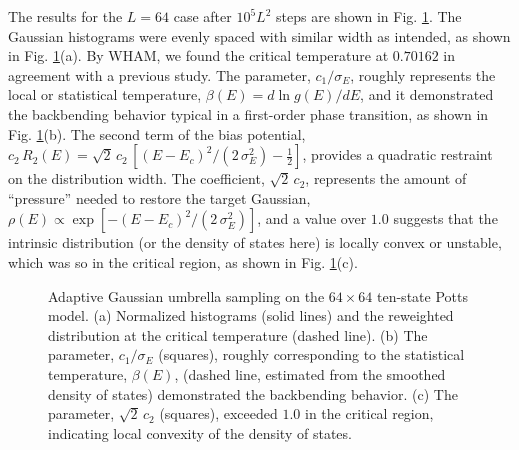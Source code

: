 \documentclass[preprint, superscriptaddress, floatfix]{revtex4-1}
\begin{document}

The results for the $L = 64$ case
after $10^5 L^2$ steps are shown
in Fig. \ref{fig:pt_hist}.
%
The Gaussian histograms were evenly spaced with similar width as intended,
as shown in Fig. \ref{fig:pt_hist}(a).
%
By WHAM, we found the critical temperature at $0.70162$
in agreement with a previous study\cite{wang2001pre}.
%
The parameter, $c_1/\sigma_E$, roughly represents
the local or statistical temperature, $\beta(E) = d\ln g(E)/dE$,
and it demonstrated
the backbending behavior\cite{kim2006, *kim2007, kim2010}
typical in a first-order phase transition,
as shown in Fig. \ref{fig:pt_hist}(b).
%
The second term of the bias potential,
$c_2 \, R_2(E) = \sqrt 2 \, c_2 \, [(E - E_c)^2/(2 \, \sigma_E^2) - \frac 1 2]$,
provides a quadratic restraint on the distribution width.
%
The coefficient, $\sqrt 2 \, c_2$, represents the amount of ``pressure''
needed to restore the target Gaussian,
$\rho(E) \propto \exp[-(E - E_c)^2/(2 \, \sigma_E^2)]$,
and a value over $1.0$ suggests
that the intrinsic distribution
(or the density of states here)
is locally convex or unstable,\cite{kim2010}
which was so in the critical region,
as shown in Fig. \ref{fig:pt_hist}(c).


\begin{figure}[h]
\begin{center}
  \caption{
    \label{fig:pt_hist}
    Adaptive Gaussian umbrella sampling
    on the $64 \times 64$ ten-state Potts model.
    (a) Normalized histograms (solid lines)
    and the reweighted distribution
    at the critical temperature (dashed line).
    (b) The parameter, $c_1/\sigma_E$ (squares), roughly corresponding to
    the statistical temperature, $\beta(E)$,
    (dashed line, estimated from the smoothed density of states)
    demonstrated the backbending behavior.
    (c) The parameter, $\sqrt 2 \, c_2$ (squares),
    exceeded $1.0$
    in the critical region, indicating local convexity
    of the density of states.
  }
\end{center}
\end{figure}
\end{document}
